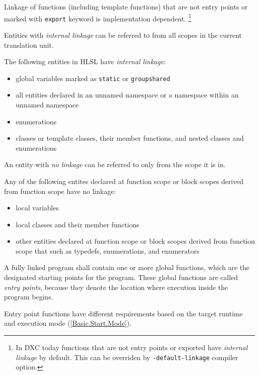 \p Linkage of functions (including template functions) that are not entry points
or marked with \texttt{export} keyword is implementation dependent. \footnote{In
DXC today functions that are not entry points or exported have \textit{internal
linkage} by default. This can be overriden by \texttt{-default-linkage} compiler
option.}


\p Entities with \textit{internal linkage} can be referred to from all scopes in
the current translation unit.

\p The following entities in HLSL have \textit{internal linkage}:
\begin{itemize}
  \item global variables marked as \texttt{static} or \texttt{groupshared}
  \item all entities declared in an unnamed namespace or a namespace within an
  unnamed namespace
  \item enumerations
  \item classes or template classes, their member functions, and nested classes
  and enumerations
\end{itemize}


\p An entity with \textit{no linkage} can be referred to only from the scope it
is in.

\p Any of the following entites declared at function scope or block scopes
derived from function scope have no linkage:
\begin{itemize}
  \item local variables
  \item local classes and their member functions
  \item other entities declared at function scope or block scopes derived from
  function scope that such as typedefs, enumerations, and enumerators
\end{itemize}


\p A fully linked program shall contain one or more global functions, which are
the designated starting points for the program. These global functions are
called \textit{entry points}, because they denote the location where execution
inside the program begins.

\p Entry point functions have different requirements based on the target runtime
and execution mode (\ref{Basic.Start.Mode}).

